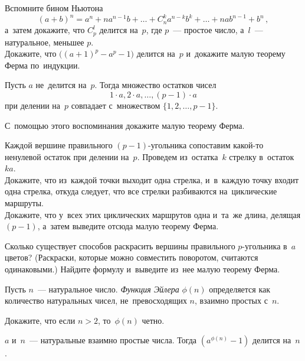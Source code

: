 \begin{problems}

\item
\subproblem
Вспомните бином Ньютона
\[
    (a + b)^n
=
    a^n + n a^{n-1} b +
    \ldots +
    C_{n}^{k} a^{n-k} b^k +
    \ldots +
    n a b^{n-1} + b^n
\,,\] а~затем докажите, что $C_{p}^{l}$ делится на~$p$, где $p$~--- простое число,
а~$l$~--- натуральное, меньшее $p$.
\\
\subproblem
Докажите, что $\bigl( (a + 1)^p - a^p - 1 \bigr)$ делится на~$p$ и~докажите
малую теорему Ферма по~индукции.

\item
\label{algebra/number-theory/fermats-theorem-g8r1:problem:fermat-proof-1}%
Пусть $a$ не~делится на~$p$.
Тогда множество остатков чисел
\[
    1 \cdot a, 2 \cdot a, \ldots, (p - 1) \cdot a
\]
при делении на~$p$ совпадает с~множеством $\{ 1, 2, \ldots, p - 1 \}$.
\par
С~помощью этого воспоминания докажите малую теорему Ферма.

\item
\label{algebra/number-theory/fermats-theorem-g8r1:problem:fermat-proof-2}%
Каждой вершине правильного $(p - 1)$-угольника сопоставим какой-то ненулевой
остаток при делении на~$p$.
Проведем из~остатка~$k$ стрелку в~остаток~$k a$.
\\
\subproblem
Докажите, что из~каждой точки выходит одна стрелка, и~в~каждую точку входит
одна стрелка, откуда следует, что все стрелки разбиваются на~циклические
маршруты.
\\
\subproblem
Докажите, что у~всех этих циклических маршрутов одна и~та~же длина, делящая
$(p - 1)$, а~затем выведите отсюда малую теорему Ферма.

\item
Сколько существует способов раскрасить вершины правильного $p$-угольника
в~$a$ цветов?
(Раскраски, которые можно совместить поворотом, считаются одинаковыми.)
Найдите формулу и~выведите из~нее малую теорему Ферма.

\end{problems}

Пусть $n$~--- натуральное число.
\emph{Функция Эйлера} $\phi(n)$ определяется как количество натуральных чисел,
не~превосходящих $n$, взаимно простых с~$n$.

Докажите, что если $n > 2$, то~$\phi(n)$ четно.

$a$ и~$n$~--- натуральные взаимно простые числа.
Тогда $(a^{\phi(n)} - 1)$ делится на~$n$.

